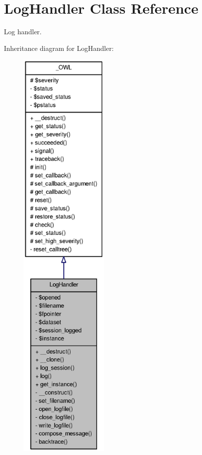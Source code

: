 \section{LogHandler Class Reference}
\label{classLogHandler}


Log handler.  




Inheritance diagram for LogHandler:
\nopagebreak
\begin{figure}[H]
\begin{center}
\leavevmode
\includegraphics[height=600pt]{classLogHandler__inherit__graph}
\end{center}
\end{figure}


